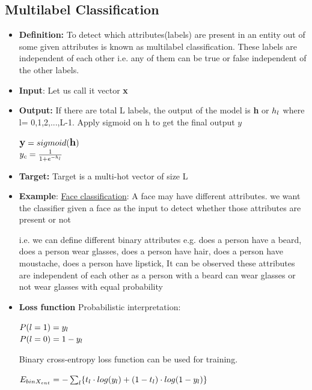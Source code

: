 \documentclass[11pt]{article}
\begin{document}
\newpage


\subsection{Multilabel Classification}
 \begin{itemize}
        \item {\textbf{Definition:}} To detect which attributes(labels) are present in an entity out of some given attributes is known as multilabel classification. 
These labels are independent of each other i.e. any of them can be true or false independent of the other labels.


\item {\textbf{Input}:} Let us call it vector \textbf{x}
\item {\textbf{Output:}} If there are total L labels, the output of the model is \textbf{h} or  $h\sb{l}$ where l= 0,1,2,...,L-1.
Apply sigmoid on h to get the final output $y$
\begin{center}
$\large \textbf{y}=sigmoid(\textbf{h})$\\
\LARGE $y\sb{c}= \frac{1}{1+e^{-h\sb{l}}}$\\
\end{center}
\item {\textbf{Target:}} Target is a multi-hot vector of size L

\item{\textbf{Example}}:  \underline{Face classification}: A face may have different attributes. we want the classifier given a face as the input to detect whether those attributes are present or not 
 
i.e.  we can define different binary attributes
e.g. does a person have a beard, 
does a person wear glasses, 
does a person have hair, 
does a person have moustache, 
does a person have lipstick, 
It can be observed these attributes are independent of each other as a person with a beard can wear glasses or not wear glasses with equal probability

\item{\textbf{Loss function}}
Probabilistic interpretation: 
\begin{center}
$P(l=1) = y\sb{l}$ \\
$P(l=0) = 1-y\sb{l}$
\end{center}

Binary cross-entropy loss function can be used for training.
\begin{center}
     $E\sb{bin X\sb{ent}} = -\sum_{l}^{} \{t\sb{l} \cdot log(y\sb{l}) + (1-t\sb{l}) \cdot log(1-y\sb{l})\}$
\end{center}
\end{itemize}
\end{document}
